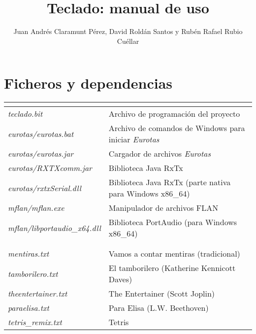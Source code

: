 \documentclass{article}
\title{Teclado: manual de uso}
\author{Juan Andrés Claramunt Pérez, David Roldán Santos y Rubén Rafael Rubio Cuéllar}
\begin{document}
\maketitle

\section{Ficheros y dependencias}

\let\sep\hline


\begin{tabu}{| >{\itshape}X[5, l] | X[14, l] |}
	 \\ \sep
	teclado.bit & Archivo de programación del proyecto \\ \sep
	eurotas/eurotas.bat & Archivo de comandos de Windows para iniciar {\itshape Eurotas} \\ \sep
	eurotas/eurotas.jar & Cargador de archivos {\itshape Eurotas} \\ \sep
	eurotas/RXTXcomm.jar & Biblioteca Java RxTx \\ \sep
	eurotas/rxtxSerial.dll & Biblioteca Java RxTx (parte nativa para Windows x86\_64) \\ \sep
	mflan/mflan.exe & Manipulador de archivos FLAN \\ \sep
	mflan/libportaudio\_x64.dll & Biblioteca PortAudio (para Windows x86\_64) \\ \sep

	 \\
	 \\ \sep
	mentiras.txt & Vamos a contar mentiras (tradicional) \\ \sep
	tamborilero.txt & El tamborilero (Katherine Kennicott Daves) \\ \sep
	theentertainer.txt & The Entertainer (Scott Joplin) \\ \sep
	paraelisa.txt & Para Elisa (L.W. Beethoven) \\ \sep
	tetris\_remix.txt & Tetris \\ \sep


\end{tabu}
\end{document}
